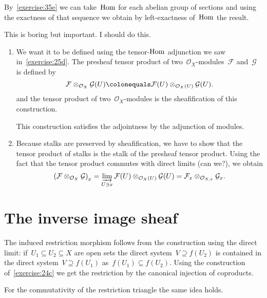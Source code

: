 \begin{exercise}
  By~\autoref{exercise:35e} we can take~$\operatorname{Hom}$ for each abelian group of sections and using the exactness of that sequence we obtain by left-exactness of~$\operatorname{Hom}$ the result.
\end{exercise}

\begin{exercise} %
  This is boring but important. I should do this.
\end{exercise}

\begin{exercise} %
  \begin{enumerate}
    \item We want it to be defined using the tensor-$\operatorname{Hom}$ adjunction we saw in~\autoref{exercise:25d}. The presheaf tensor product of two~$\mathcal{O}_X$-modules~$\mathcal{F}$ and~$\mathcal{G}$ is defined by
      \begin{equation}
        \mathcal{F}\otimes_{\mathcal{O}_X}\mathcal{G}(U)\colonequals\mathcal{F}(U)\otimes_{\mathcal{O}_X(U)}\mathcal{G}(U).
      \end{equation}
      and the tensor product of two~$\mathcal{O}_X$\nobreakdash-modules is the sheafification of this construction.

      This construction satisfies the adjointness by the adjunction of modules.

    \item Because stalks are preserved by sheafification, we have to show that the tensor product of stalks is the stalk of the presheaf tensor product. Using the fact that the tensor product commutes with direct limits (can we?), we obtain
      \begin{equation}
        \left( \mathcal{F}\otimes_{\mathcal{O}_X}\mathcal{G} \right)_x=\varinjlim_{U\ni x}\mathcal{F}(U)\otimes_{\mathcal{O}_X(U)}\mathcal{G}(U)=\mathcal{F}_x\otimes_{\mathcal{O}_{X,x}}\mathcal{G}_x.
      \end{equation}
  \end{enumerate}
\end{exercise}


\section{The inverse image sheaf}

\begin{exercise}
  The induced restriction morphism follows from the construction using the direct limit: if~$U_1\subseteq U_2\subseteq X$ are open sets the direct system~$V\supseteq f(U_2)$ is contained in the direct system~$V\supseteq f(U_1)$ as~$f(U_1)\subseteq f(U_2)$. Using the construction of~\autoref{exercise:24c} we get the restriction by the canonical injection of coproducts.

  For the commutativity of the restriction triangle the same idea holds.
\end{exercise}

